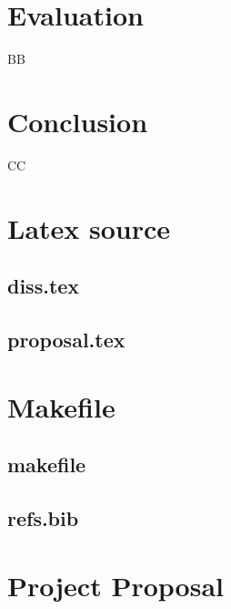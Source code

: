 \documentclass[12pt,a4paper,twoside,openright]{report}
\begin{document}
\chapter{Evaluation}
BB


\chapter{Conclusion}
CC


\appendix
\chapter{Latex source}
\section{diss.tex}
{\scriptsize}
\section{proposal.tex}
{\scriptsize}
\chapter{Makefile}
\section{makefile}\label{makefile}
{\scriptsize}
\section{refs.bib}
{\scriptsize}
\chapter{Project Proposal}

\end{document}
